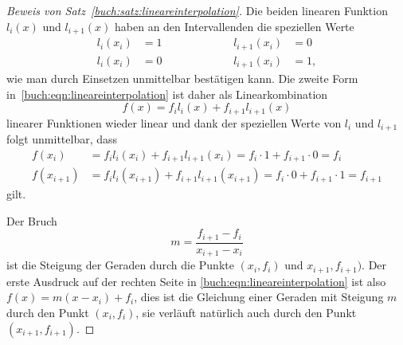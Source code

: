 \begin{proof}[Beweis von Satz~\ref{buch:satz:lineareinterpolation}]
Die beiden linearen Funktion $l_i(x)$ und $l_{i+1}(x)$ haben an den 
Intervallenden die speziellen Werte
\[
\begin{aligned}
l_i(x_i)&=1  &\qquad&\qquad& l_{i+1}(x_i)&=0 \\
l_i(x_i)&=0  &\qquad&\qquad& l_{i+1}(x_i)&=1,
\end{aligned}
\]
wie man durch Einsetzen unmittelbar bestätigen kann.
Die zweite Form in~\eqref{buch:eqn:lineareinterpolation}
ist daher als Linearkombination
\[
f(x)=f_il_i(x) + f_{i+1}l_{i+1}(x)
\]
linearer Funktionen wieder
linear und dank der speziellen Werte von $l_i$ und $l_{i+1}$ folgt
unmittelbar, dass
\begin{align*}
f(x_i)&=f_il_i(x_i) + f_{i+1}l_{i+1}(x_i) = f_i\cdot 1 + f_{i+1}\cdot 0= f_i\\
f(x_{i+1})&=f_il_i(x_{i+1}) + f_{i+1}l_{i+1}(x_{i+1})= f_i\cdot 0 + f_{i+1}\cdot 1=f_{i+1}
\end{align*}
gilt.

Der Bruch
%
\[
m = \frac{f_{i+1}-f_i}{x_{i+1}-x_i}
\]
ist die Steigung der Geraden durch die Punkte $(x_i,f_i)$ und
$x_{i+1},f_{i+1})$.
%
Der erste Ausdruck auf der rechten Seite in
\eqref{buch:eqn:lineareinterpolation} ist
also $f(x)=m(x-x_i)+f_i$, dies ist die Gleichung einer Geraden
mit Steigung $m$ durch den Punkt $(x_i,f_i)$, sie verläuft natürlich
auch durch den Punkt $(x_{i+1},f_{i+1})$.
%
\end{proof}


